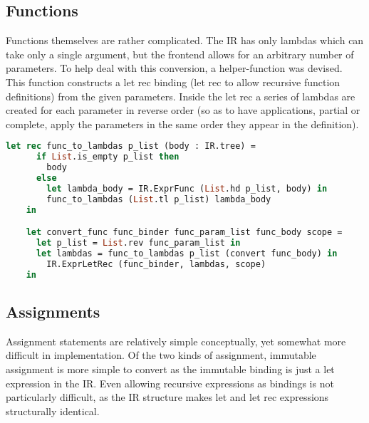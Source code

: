 \documentclass{l4proj}
\begin{document}
\subsection{Functions}
Functions themselves are rather complicated.
The IR has only lambdas which can take only a single argument, but the frontend allows for an arbitrary number of parameters.
To help deal with this conversion, a helper-function was devised.
This function constructs a let rec binding (let rec to allow recursive function definitions) from the given parameters.
Inside the let rec a series of lambdas are created for each parameter in reverse order (so as to have applications, partial or complete, apply the parameters in the same order they appear in the definition).
\newpage
\begin{lstlisting}[language=Caml, keepspaces=true, caption=PyFunc frontend's function binding conversion code.]
    let rec func_to_lambdas p_list (body : IR.tree) =
      if List.is_empty p_list then
        body
      else
        let lambda_body = IR.ExprFunc (List.hd p_list, body) in
        func_to_lambdas (List.tl p_list) lambda_body
    in

    let convert_func func_binder func_param_list func_body scope =
      let p_list = List.rev func_param_list in
      let lambdas = func_to_lambdas p_list (convert func_body) in
        IR.ExprLetRec (func_binder, lambdas, scope)
    in
\end{lstlisting}


\subsection{Assignments}
Assignment statements are relatively simple conceptually, yet somewhat more difficult in implementation.
Of the two kinds of assignment, immutable assignment is more simple to convert as the immutable binding is just a let expression in the IR.
Even allowing recursive expressions as bindings is not particularly difficult, as the IR structure makes let and let rec expressions structurally identical.
\end{document}
